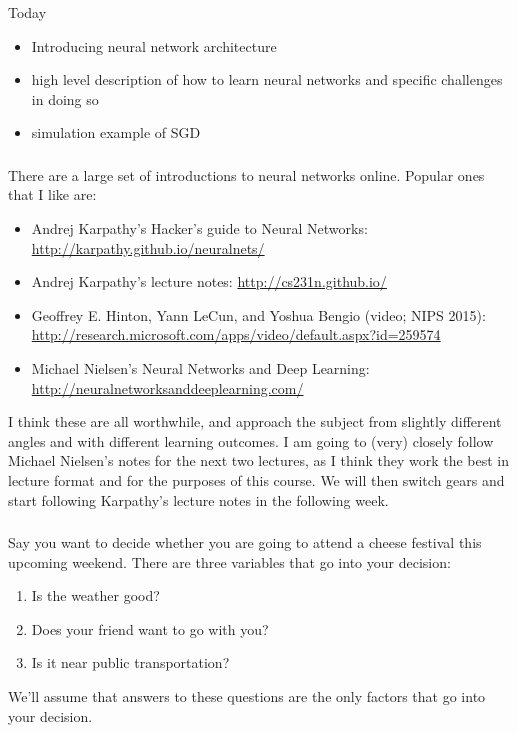 \documentclass[xetex,mathserif,serif,aspectratio=169]{beamer}
\begin{document}
\begin{frame}[fragile] \frametitle{} \oldB \small

Today
\begin{itemize}
\item Introducing neural network architecture
\item high level description of how to learn neural networks
and specific challenges in doing so
\item simulation example of SGD
\end{itemize}

\end{frame}

\begin{frame}[fragile] \frametitle{} \oldB \small

There are a large set of introductions to neural networks online. Popular
ones that I like are:

\begin{itemize}
\item Andrej Karpathy's Hacker's guide to Neural Networks: \url{http://karpathy.github.io/neuralnets/}
\item Andrej Karpathy's lecture notes: \url{http://cs231n.github.io/}
\item Geoffrey E. Hinton, Yann LeCun, and Yoshua Bengio (video; NIPS 2015): \url{http://research.microsoft.com/apps/video/default.aspx?id=259574}
\item Michael Nielsen's Neural Networks and Deep Learning: \url{http://neuralnetworksanddeeplearning.com/}
\end{itemize}

I think these are all worthwhile, and approach the subject from slightly different
angles and with different learning outcomes. I am going to (very) closely follow
Michael Nielsen's notes for the next two lectures, as I think they work the best
in lecture format and for the purposes of this course. We will then switch gears
and start following Karpathy's lecture notes in the following week.

\end{frame}

\begin{frame}[fragile] \frametitle{} \oldB \small


Say you want to decide whether you are going to attend a cheese festival this
upcoming weekend. There are three variables that go into your decision:
\begin{enumerate}
\item Is the weather good?
\item Does your friend want to go with you?
\item Is it near public transportation?
\end{enumerate}
We'll assume that answers to these questions are the only factors that go
into your decision.

\end{frame}
\end{document}
